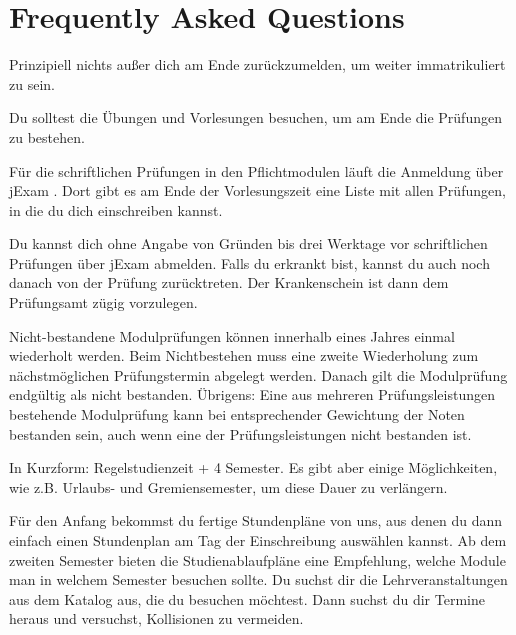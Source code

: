 \newcommand{\fancypageref}[1] {%
    \changemenucolor{gray}{br}{named}{fancypageref_color}%
    \changemenucolor{gray}{txt}{named}{fancypageref_color}%
    \keys{Seite \pageref{#1}}%
    \changemenucolor{gray}{br}{named}{ese_bg_color}%
    \changemenucolor{gray}{txt}{named}{ese_bg_color}%
}

\chapter*{Frequently Asked Questions}
\label{sec:faq}
Prinzipiell nichts außer dich am Ende zurückzumelden, um weiter immatrikuliert zu sein.

Du solltest die Übungen und Vorlesungen besuchen, um am Ende die Prüfungen zu bestehen.

Für die schriftlichen Prüfungen in den Pflichtmodulen läuft die Anmeldung über jExam .
Dort gibt es am Ende der Vorlesungszeit eine Liste mit allen Prüfungen, in die du dich einschreiben kannst.

Du kannst dich ohne Angabe von Gründen bis drei Werktage vor schriftlichen Prüfungen über jExam abmelden. Falls du erkrankt bist, kannst du auch noch danach von der Prüfung zurücktreten. Der Krankenschein ist dann dem Prüfungsamt zügig vorzulegen.

Nicht-bestandene Modulprüfungen können innerhalb eines Jahres einmal wiederholt werden. Beim Nichtbestehen muss eine zweite Wiederholung zum nächstmöglichen Prüfungstermin abgelegt werden. Danach gilt die Modulprüfung endgültig als nicht bestanden. Übrigens: Eine aus mehreren Prüfungsleistungen bestehende Modulprüfung kann bei entsprechender Gewichtung der Noten bestanden sein, auch wenn eine der Prüfungsleistungen nicht bestanden ist.

In Kurzform: Regelstudienzeit + 4 Semester. Es gibt aber einige Möglichkeiten, wie z.B. Urlaubs- und Gremiensemester, um diese Dauer zu verlängern.

Für den Anfang bekommst du fertige Stundenpläne von uns, aus denen du dann einfach einen Stundenplan am Tag der Einschreibung auswählen kannst. Ab dem zweiten Semester bieten die Studienablaufpläne eine Empfehlung, welche Module man in welchem Semester besuchen sollte. Du suchst dir die Lehrveranstaltungen aus dem Katalog aus, die du besuchen möchtest. Dann suchst du dir Termine heraus und versuchst, Kollisionen zu vermeiden.

